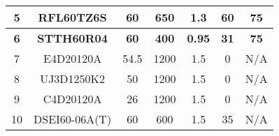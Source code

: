 \begin{table}[tbh!]
{\begin{tabular}{|c|c|c|c|c|c|c|}
\rowcolor[HTML]{C6E0B4} 
5 & RFL60TZ6S & 60 & 650 & 1.3 & 60 & 75 \\ \hline
\rowcolor[HTML]{C6E0B4} 
{\color[HTML]{FE0000} \textbf{6}} & {\color[HTML]{FE0000} \textbf{STTH60R04}} & {\color[HTML]{FE0000} \textbf{60}} & {\color[HTML]{FE0000} \textbf{400}} & {\color[HTML]{FE0000} \textbf{0.95}} & {\color[HTML]{FE0000} \textbf{31}} & {\color[HTML]{FE0000} \textbf{75}} \\ \hline
\rowcolor[HTML]{FFFFFF} 
7 & E4D20120A & 54.5 & 1200 & 1.5 & 0 & N/A \\ \hline
\rowcolor[HTML]{FFFFFF} 
8 & UJ3D1250K2 & 50 & 1200 & 1.5 & 0 & N/A \\ \hline
\rowcolor[HTML]{FFFFFF} 
9 & C4D20120A & 26 & 1200 & 1.5 & 0 & N/A \\ \hline
\rowcolor[HTML]{C6E0B4} 
10 & DSEI60-06A(T) & 60 & 600 & 1.5 & 35 & N/A \\ \hline
\end{tabular}%
}
\end{table}